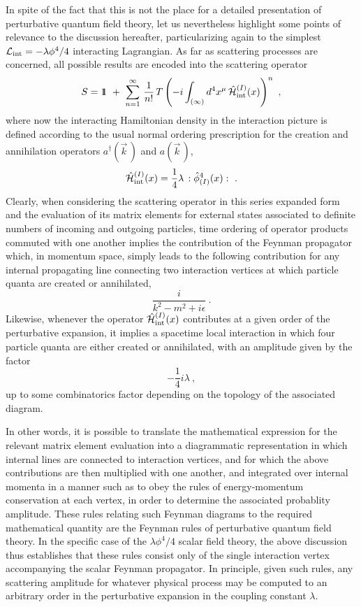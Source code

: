 \documentclass[a4paper,11pt]{article}
\def\one{1\hskip -.37em 1}
\begin{document}
In spite of the fact that this is not the place for a detailed presentation
of perturbative quantum field theory, let us nevertheless highlight some
points of relevance to the discussion hereafter, particularizing again to
the simplest ${\cal L}_{\rm int}=-\lambda\phi^4/4$ interacting Lagrangian.
As far as scattering processes are concerned, all possible results are
encoded into the scattering operator
\begin{equation}
S=\one\ +\ \sum_{n=1}^\infty\,\frac{1}{n!}\,
T\left(-i\int_{(\infty)}d^4x^\mu\,\hat{\cal H}^{(I)}_{\rm int}(x)\right)^n\ ,
\end{equation}
where now the interacting Hamiltonian density in the interaction picture
is defined according to the usual normal ordering prescription for the
creation and annihilation operators $a^\dagger(\vec{k}\,)$ and $a(\vec{k}\,)$,
\begin{equation}
\hat{\cal H}^{(I)}_{\rm int}(x)=\frac{1}{4}\lambda\,:\hat{\phi}^4_{(I)}(x):\ .
\end{equation}
Clearly, when considering the scattering operator in this series expanded
form and the evaluation of its matrix elements for external states associated
to de\-fi\-ni\-te numbers of incoming and outgoing particles, time ordering
of operator products commuted with one another implies the contribution
of the Feynman propagator which, in momentum space, simply leads to the
following contribution for any internal propagating line connecting two
interaction vertices at which particle quanta are created or annihilated,
\begin{equation}
\frac{i}{k^2-m^2+i\epsilon}\ .
\end{equation}
Likewise, whenever the operator $\hat{\cal H}^{(I)}_{\rm int}(x)$ contributes
at a given order of the perturbative expansion, it implies a spacetime
local interaction in which four particle quanta are either created or
annihilated, with an amplitude given by the factor
\begin{equation}
-\frac{1}{4}i\lambda\ ,
\end{equation}
up to some combinatorics factor depending on the topology of the associated
diagram.

In other words, it is possible to translate the mathematical expression for 
the relevant matrix element evaluation into a diagrammatic representation
in which internal lines are connected to interaction vertices, and for which
the above contributions are then multiplied with one another, and integrated
over internal momenta in a manner such as to obey the rules of energy-momentum
conservation at each vertex, in order to determine the associated probablity
amplitude. These rules relating such Feynman diagrams to the required
ma\-the\-ma\-ti\-cal quantity are the Feynman rules of perturbative quantum 
field theory. In the specific case of the $\lambda\phi^4/4$ scalar field theory,
the above discussion thus establishes that these rules consist only of
the single interaction vertex accompanying the scalar Feynman
propagator. In principle, given such rules, any scattering amplitude for
whatever physical process may be computed to an arbitrary order in the
perturbative expansion in the coupling constant $\lambda$.
\end{document}
